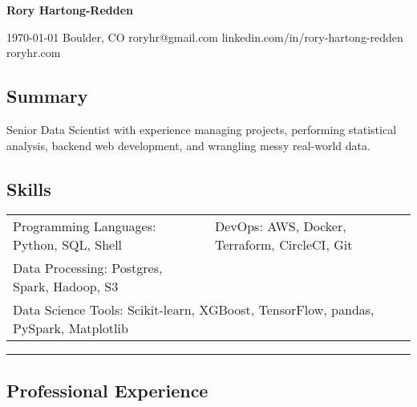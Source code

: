 \documentclass[10pt,letterpaper]{article}
\newenvironment{indentsection}[1]
{\begin{list}{}%
	{\setlength{\leftmargin}{#1}}
	\item[]%
}
{\end{list}}
\begin{document}
{\raggedright \LARGE \bf Rory Hartong-Redden}

{\raggedleft 
\today \/ \textbar
\/ Boulder, CO \textbar
\/ roryhr@gmail.com \textbar
\/ linkedin.com/in/rory-hartong-redden \textbar
\/ roryhr.com
\\
}

\subsection*{Summary}
\begin{centering}  
Senior Data Scientist with experience managing projects, performing statistical analysis, backend web development, and wrangling messy real-world data.
\end{centering}

\subsection*{Skills}
\begin{indentsection}{\parindent}
\begin{tabular}{p{0.5\linewidth}   p{0.5\linewidth}} 
	Programming Languages: Python, SQL, Shell
	& DevOps: AWS, Docker, Terraform, CircleCI, Git \\

	Data Processing: Postgres, Spark, Hadoop, S3  \\ 	
	\multicolumn{2}{l}{
		Data Science Tools: Scikit-learn, XGBoost, TensorFlow, pandas, PySpark, Matplotlib
		}
\end{tabular}
\end{indentsection}

\hrule
\subsection*{Professional Experience}
\end{document}
